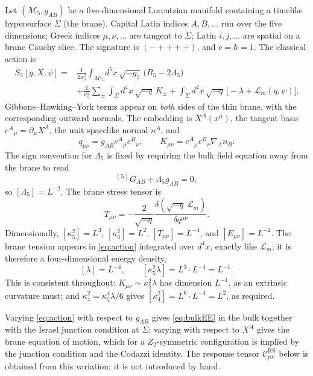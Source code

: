 \documentclass[11pt,a4paper]{article}
\theoremstyle{plain}
\theoremstyle{definition}
\newcommand{\kfive}{\kappa_5}
\newcommand{\kfour}{\kappa_4}
\newcommand{\Lfive}{\Lambda_5}
\newcommand{\RS}{\mathrm{RS}}
\begin{document}
Let $(\mathcal M_5,g_{AB})$ be a five-dimensional Lorentzian manifold
containing a timelike hypersurface $\Sigma$ (the brane). Capital Latin
indices $A,B,\dots$ run over the five dimensions; Greek indices
$\mu,\nu,\dots$ are tangent to $\Sigma$; Latin $i,j,\dots$ are spatial on
a brane Cauchy slice. The signature is $(-++++)$, and $c=\hbar=1$. The
classical action is
\begin{equation}
\label{eq:action}
\begin{aligned}
S_5[g,X,\psi]
={}&\frac{1}{2\kfive^2}\int_{\mathcal M_5}d^5x\,\sqrt{-g_5}\,
\bigl(R_5-2\Lfive\bigr)\\
&+\frac{1}{\kfive^2}\sum_{\pm}\int_{\Sigma}d^4x\,\sqrt{-q}\,K_\pm
+\int_{\Sigma}d^4x\,\sqrt{-q}\,
\bigl[-\lambda+\mathcal L_m(q,\psi)\bigr].
\end{aligned}
\end{equation}
Gibbons--Hawking--York terms appear on \emph{both} sides of the thin
brane, with the corresponding outward normals. The embedding is
$X^A(x^\mu)$, the tangent basis $e^A{}_\mu=\partial_\mu X^A$, the unit
spacelike normal $n^A$, and
\begin{equation}
\label{eq:induced}
q_{\mu\nu}=g_{AB}e^A{}_\mu e^B{}_\nu,
\qquad
K_{\mu\nu}=e^A{}_\mu e^B{}_\nu\nabla_A n_B .
\end{equation}
The sign convention for $\Lfive$ is fixed by requiring the bulk field
equation away from the brane to read
\begin{equation}
\label{eq:bulkEE}
{}^{(5)}G_{AB}+\Lfive g_{AB}=0 ,
\end{equation}
so $[\Lfive]=L^{-2}$. The brane stress tensor is
\begin{equation}
\label{eq:Tdef}
T_{\mu\nu}=-\frac{2}{\sqrt{-q}}
\frac{\delta(\sqrt{-q}\,\mathcal L_m)}{\delta q^{\mu\nu}} .
\end{equation}
Dimensionally, $[\kfive^2]=L^3$, $[\kfour^2]=L^2$, $[T_{\mu\nu}]=L^{-4}$,
and $[E_{\mu\nu}]=L^{-2}$. The brane tension appears in \eqref{eq:action}
integrated over $d^4x$, exactly like $\mathcal L_m$; it is therefore a
four-dimensional energy density,
\begin{equation}
\label{eq:lambdadim}
[\lambda]=L^{-4},
\qquad
[\kfive^2\lambda]=L^{3}\cdot L^{-4}=L^{-1}.
\end{equation}
This is consistent throughout: $K_{\mu\nu}\sim\kfive^2\lambda$ has
dimension $L^{-1}$, as an extrinsic curvature must; and
$\kfour^2=\kfive^4\lambda/6$ gives
$[\kfour^2]=L^{6}\cdot L^{-4}=L^{2}$, as required.

Varying \eqref{eq:action} with respect to $g_{AB}$ gives
\eqref{eq:bulkEE} in the bulk together with the Israel junction condition
at $\Sigma$; varying with respect to $X^A$ gives the brane equation of
motion, which for a $Z_2$-symmetric configuration is implied by the
junction condition and the Codazzi identity. The response tensor
$\mathcal C^{\RS}_{\mu\nu}$ below is obtained from this variation; it is
not introduced by hand.
\end{document}
